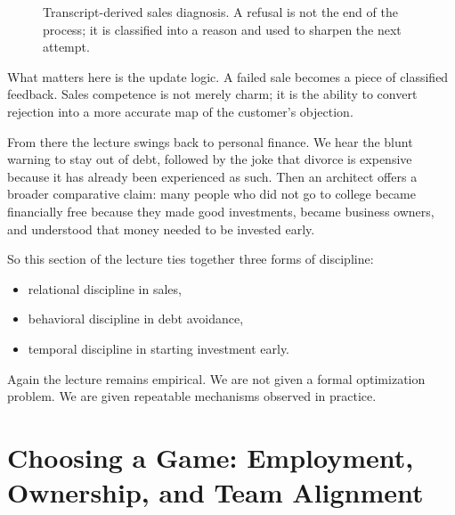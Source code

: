 \begin{figure}[h]
\centering
{}
\caption{Transcript-derived sales diagnosis. A refusal is not the end of the process; it is classified into a reason and used to sharpen the next attempt.}
\end{figure}

What matters here is the update logic. A failed sale becomes a piece of classified feedback. Sales competence is not merely charm; it is the ability to convert rejection into a more accurate map of the customer's objection.

From there the lecture swings back to personal finance. We hear the blunt warning to stay out of debt, followed by the joke that divorce is expensive because it has already been experienced as such. Then an architect offers a broader comparative claim: many people who did not go to college became financially free because they made good investments, became business owners, and understood that money needed to be invested early.

So this section of the lecture ties together three forms of discipline:
\begin{itemize}
\item relational discipline in sales,
\item behavioral discipline in debt avoidance,
\item temporal discipline in starting investment early.
\end{itemize}

Again the lecture remains empirical. We are not given a formal optimization problem. We are given repeatable mechanisms observed in practice.

\section{Choosing a Game: Employment, Ownership, and Team Alignment}

